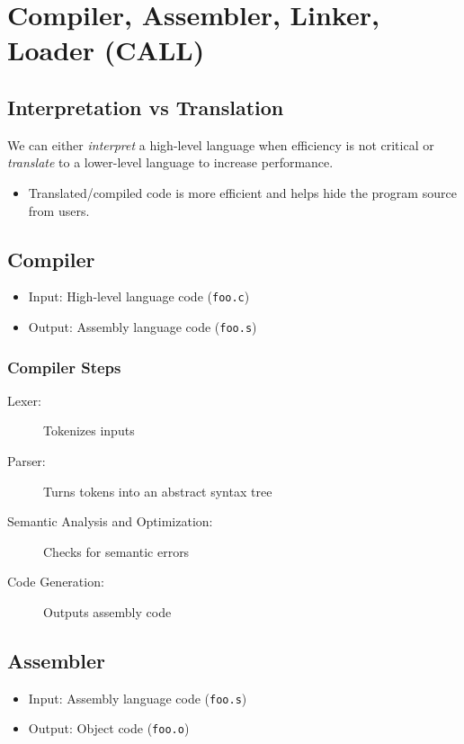 \chapter{Compiler, Assembler, Linker, Loader (CALL)}

\section{Interpretation vs Translation}
We can either \emph{interpret} a high-level language when efficiency is not critical or \emph{translate} to a lower-level language to increase performance.
\begin{itemize}
    \item Translated/compiled code is more efficient and helps hide the program source from users.
\end{itemize}

\section{Compiler}
\begin{itemize}
    \item Input: High-level language code (\texttt{foo.c})
    \item Output: Assembly language code (\texttt{foo.s})
\end{itemize}

\subsection{Compiler Steps}
\begin{description}
    \item[Lexer:] Tokenizes inputs
    \item[Parser:] Turns tokens into an abstract syntax tree
    \item[Semantic Analysis and Optimization:] Checks for semantic errors
    \item[Code Generation:] Outputs assembly code
\end{description}

\section{Assembler}
\begin{itemize}
    \item Input: Assembly language code (\texttt{foo.s})
    \item Output: Object code (\texttt{foo.o})
\end{itemize}

